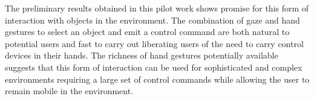 \documentclass[jou,a4paper,notxfonts]{apa}
\begin{document}
The preliminary results obtained  in this pilot work shows promise for this form of interaction with objects in the
environment. The combination of gaze and hand gestures to select an object  and emit a control command are both natural 
to potential users and fast to carry out liberating users of the need to carry control devices in their hands. The richness of hand gestures potentially available suggests that this form of interaction can be used for sophisticated and complex environments requiring  a large set of control commands while allowing the user to remain mobile in the environment.





\end{document}

